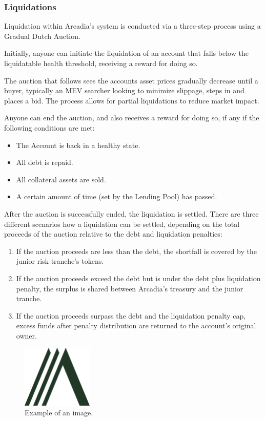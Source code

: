 \documentclass[sigconf,nonacm]{acmart}
\begin{document}
\subsubsection{Liquidations}
\label{subsubsec:liquidations}
Liquidation within Arcadia's system is conducted via a three-step process using a Gradual Dutch Auction.

Initially, anyone can initiate the liquidation of an account that falls below the liquidatable health threshold,
receiving a reward for doing so.

The auction that follows sees the accounts asset prices gradually decrease until a buyer,
typically an MEV searcher looking to minimize slippage, steps in and places a bid.
The process allows for partial liquidations to reduce market impact.

Anyone can end the auction, and also receives a reward for doing so, if any if the following conditions are met:
\begin{itemize}
    \item The Account is back in a healthy state.
    \item All debt is repaid.
    \item All collateral assets are sold.
    \item A certain amount of time (set by the Lending Pool) has passed.
\end{itemize}

After the auction is successfully ended, the liquidation is settled.
There are three different scenarios how a liquidation can be settled,
depending on the total proceeds of the auction relative to the debt and liquidation penalties:
\begin{enumerate}
    \item If the auction proceeds are less than the debt,
    the shortfall is covered by the junior risk tranche's tokens.
    \item If the auction proceeds exceed the debt but is under the debt plus liquidation penalty,
    the surplus is shared between Arcadia's treasury and the junior tranche.
    \item If the auction proceeds surpass the debt and the liquidation penalty cap,
    excess funds after penalty distribution are returned to the account's original owner.
\end{enumerate}


\begin{figure}
    \label{fig:arcadia-logo}
    \centering
    \includegraphics[width=0.3\textwidth]{images/Logo-Arcadia.png}
    \caption{Example of an image.}
  \end{figure}
\end{document}
